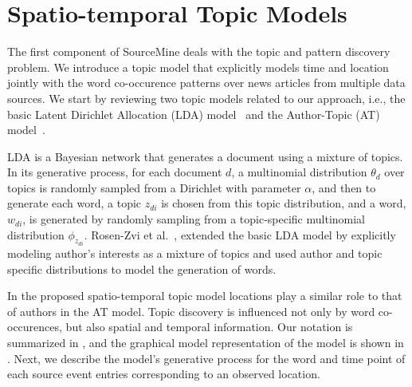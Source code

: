 \documentclass[conference]{IEEEtran}
\newcommand{\fullmodel}{{{\sf SourceMine}}\xspace}
\begin{document}
\section{Spatio-temporal Topic Models}
\label{sec:model}
The first component of \fullmodel deals with the topic and pattern discovery problem.  We introduce a topic model that explicitly models time and location jointly with the word co-occurence patterns over news articles from multiple data sources. We start by reviewing two topic models related to our approach, i.e., the basic Latent Dirichlet Allocation (LDA) model~\cite{blei:2003} and the Author-Topic (AT) model~\cite{rosen:2004}. 

LDA is a Bayesian network that generates a document using a mixture of topics. In its generative process, for each document $d$, a multinomial distribution $\theta_d$ over topics is randomly sampled from a Dirichlet with parameter $\alpha$, and then to generate each word, a topic $z_{di}$ is chosen from this topic distribution, and a word, $w_{di}$, is generated by randomly sampling from a topic-specific multinomial distribution $\phi_{z_{di}}$.  Rosen-Zvi et al.~\cite{rosen:2004}, extended the basic LDA model by explicitly modeling author's interests as a mixture of topics and used author and topic specific distributions to model the generation of words.

In the proposed spatio-temporal topic model locations play a similar role to that of authors in the AT model. Topic discovery is influenced not only by word co-occurences, but also spatial and temporal information. Our notation is summarized in , and the graphical model representation of the model is shown in .  Next, we describe the model's generative process for the word and time point of each source event entries corresponding to an observed location.
\end{document}

